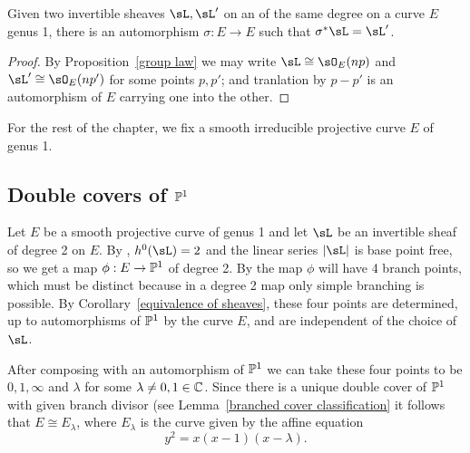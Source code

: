 \begin{corollary}\label{equivalence of sheaves}
Given two invertible sheaves $\sL, \sL'$ on an of the same degree on a curve $E$ genus 1, there is an automorphism $\sigma: E\to E$
such that $\sigma^*\sL = \sL'$.
\end{corollary}

\begin{proof}
By Proposition~\ref{group law} we may write $\sL \cong \sO_E(np)$ and $\sL'\cong \sO_E(np')$ for some points $p,p'$; and tranlation by $p-p'$
is an automorphism of $E$ carrying one into the other.
\end{proof}


For the rest of the chapter, we fix a smooth irreducible projective curve $E$ of genus 1.

\subsection{Double covers of $\PP^1$}

Let $E$ be a smooth projective curve of genus 1 and let  $\sL$ be an invertible sheaf of degree 2 on $E$. By \trr{},\kern -3pt $h^0(\sL) = 2$ and the linear series $|\sL|$ is base point free, so we get a map $\phi : E \to \PP^1$ of degree 2. By \trh the map $\phi$ will have 4 branch points, which must be distinct because in a degree 2 map
only simple branching is possible. By Corollary~\ref{equivalence of sheaves}, these four points are determined, up to automorphisms of $\PP^1$ by the curve $E$, and are independent of the choice of $\sL$.

After composing with an automorphism of $\PP^1$ we can take these four points to be $0, 1, \infty$ and $\lambda$ for some $\lambda \neq 0, 1 \in \CC$. Since there is a unique double cover of $\PP^1$ with given branch divisor (see Lemma~\ref{branched cover classification} it follows that $E \cong E_\lambda$, where $E_\lambda$ is the curve given by the affine equation
$$
y^2 = x(x-1)(x-\lambda).
$$

